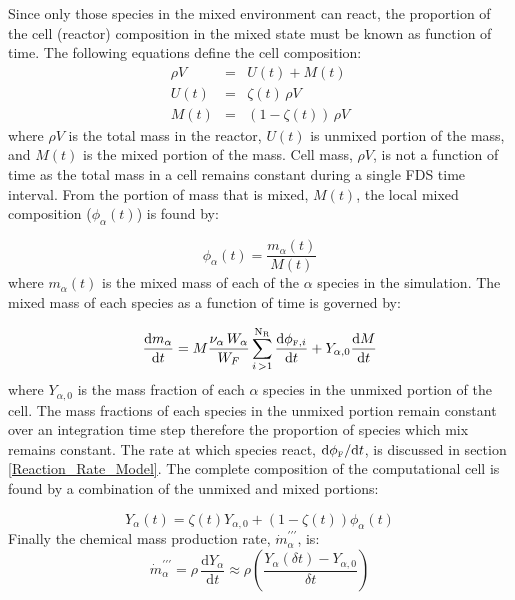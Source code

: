 Since only those species in the mixed environment can react, the proportion of the cell (reactor) composition in the mixed state must be known as function of time. The following equations define the cell composition:
\begin{eqnarray}\label{eq:mixunmix}
\rho V &=& U(t) + M(t) \\
U(t) &=& \zeta(t)\,\rho V \\
M(t) &=& (1-\zeta(t))\,\rho V
\end{eqnarray} 
where $\rho V$ is the total mass in the reactor, $U(t)$ is unmixed portion of the mass, and $M(t)$ is the mixed portion of the mass. Cell mass, $\rho V$, is not a function of time as the total mass in a cell remains constant during a single FDS time interval. From the portion of mass that is mixed, $M(t)$, the local mixed composition ($\phi_{\alpha}(t)$) is found by:

\begin{equation}\label{eq:phi}
\phi_{\alpha}(t)=\frac{m_{\alpha}(t)}{M(t)}
\end{equation}
where $m_\alpha(t)$ is the mixed mass of each of the $\alpha$ species in the simulation. The mixed mass of each species as a function of time is governed by:

\begin{equation}\label{eq:mixmass}
\frac{\mbox{d}m_{\alpha}}{\mbox{d}t}=M\frac{\nu_{\alpha} \, W_{\alpha}}{W_F}\displaystyle \sum_{i\,>1}^{\mathrm{N_{R}}}\frac{\mbox{d}\phi_{{\tiny \hbox{F}},i}}{\mbox{d}t}+Y_{\alpha,0}\frac{\mbox{d}M}{\mbox{d}t} 
\end{equation}
where $Y_{\alpha,0}$ is the mass fraction of each $\alpha$ species in the unmixed portion of the cell. The mass fractions of each species in the unmixed portion remain constant over an integration time step therefore the proportion of species which mix remains constant. The rate at which species react, $\mbox{d}\phi_{\tiny \hbox{F}}/\mbox{d}t$, is discussed in section \ref{Reaction_Rate_Model}. The complete composition of the computational cell is found by a combination of the unmixed and mixed portions:

\begin{equation}\label{eq:final_comp}
Y_{\alpha}(t)=\zeta(t)Y_{\alpha,0}+(1-\zeta(t))\phi_{\alpha}(t)
\end{equation}
Finally the chemical mass production rate, $\dot{m}^{\prime\prime\prime}_{\alpha}$, is:
\begin{equation}\label{mass_prod_rate}
\dot{m}^{\prime\prime\prime}_{\alpha}=\rho \,\frac{\mbox{d}Y_{\alpha}}{\mbox{d}t} \approx \rho \left(\frac{Y_{\alpha}(\delta t) - Y_{\alpha,0}}{\delta t}\right)
\end{equation}

